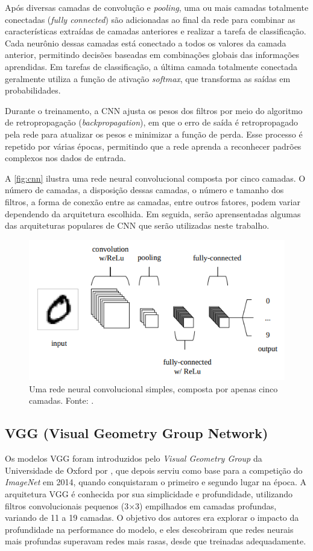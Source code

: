 Após diversas camadas de convolução e \textit{pooling}, uma ou mais camadas totalmente conectadas (\textit{fully connected}) são adicionadas ao final da rede para combinar as características extraídas de camadas anteriores e realizar a tarefa de classificação. Cada neurônio dessas camadas está conectado a todos os valores da camada anterior, permitindo decisões baseadas em combinações globais das informações aprendidas. Em tarefas de classificação, a última camada totalmente conectada geralmente utiliza a função de ativação \textit{softmax}, que transforma as saídas em probabilidades.

Durante o treinamento, a CNN ajusta os pesos dos filtros por meio do algoritmo de retropropagação (\textit{backpropagation}), em que o erro de saída é retropropagado pela rede para atualizar os pesos e minimizar a função de perda. Esse processo é repetido por várias épocas, permitindo que a rede aprenda a reconhecer padrões complexos nos dados de entrada.

A \autoref{fig:cnn} ilustra uma rede neural convolucional composta por cinco camadas. O número de camadas, a disposição dessas camadas, o número e tamanho dos filtros, a forma de conexão entre as camadas, entre outros fatores, podem variar dependendo da arquitetura escolhida. Em seguida, serão aprensentadas algumas das arquiteturas populares de CNN que serão utilizadas neste trabalho.

\begin{figure}
    \centering
    \includegraphics[width=0.5\linewidth]{figs/convolution-neural-network.png}
    \caption{Uma rede neural convolucional simples, composta por apenas cinco camadas. Fonte: \cite{Saxena2022}.}
    \label{fig:cnn}
\end{figure}

\subsection{VGG (Visual Geometry Group Network)}

Os modelos VGG foram introduzidos pelo \textit{Visual Geometry Group} da Universidade de Oxford por \cite{Simonyan2015}, que depois serviu como base para a competição do \textit{ImageNet} em 2014, quando conquistaram o primeiro e segundo lugar na época. A arquitetura VGG é conhecida por sua simplicidade e profundidade, utilizando filtros convolucionais pequenos (3×3) empilhados em camadas profundas, variando de 11 a 19 camadas. O objetivo dos autores era explorar o impacto da profundidade na performance do modelo, e eles descobriram que redes neurais mais profundas superavam redes mais rasas, desde que treinadas adequadamente.

